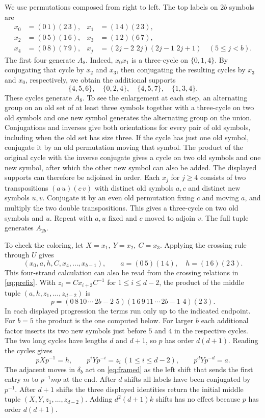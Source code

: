 We use permutations composed from right to left. The top labels on
\(2b\) symbols are
\[
\begin{aligned}
 x_0&=(0\,1)(2\,3), &x_1&=(1\,4)(2\,3),\\
 x_2&=(0\,5)(1\,6), &x_3&=(1\,2)(6\,7),\\
 x_4&=(0\,8)(7\,9), &
 x_j&=(2j-2\,\,2j)(2j-1\,\,2j+1)\quad(5\le j<b).
\end{aligned}
\]
The first four generate \(A_8\). Indeed, \(x_0x_1\) is a
three-cycle on \(\{0,1,4\}\). By conjugating that cycle by \(x_2\)
and \(x_3\), then conjugating the resulting cycles by \(x_3\) and
\(x_0\), respectively, we obtain the additional supports
\[
       \{4,5,6\},\quad \{0,2,4\},\quad \{4,5,7\},\quad \{1,3,4\}.
\]
These cycles generate \(A_8\). To see the enlargement at each step,
an alternating group on an old set of at least three symbols together
with a three-cycle on two old symbols and one new symbol generates
the alternating group on the union. Conjugations and inverses give
both orientations for every pair of old symbols, including when the
old set has size three. If the cycle has just one old symbol,
conjugate it by an old permutation moving that symbol. The product
of the original cycle with the inverse conjugate gives a cycle on
two old symbols and one new symbol, after which the other new
symbol can also be added. The displayed supports can therefore be
adjoined in order. Each \(x_j\) for \(j\ge4\) consists of two
transpositions \((a\,u)(c\,v)\) with distinct old symbols \(a,c\)
and distinct new symbols \(u,v\). Conjugate it by an even old
permutation fixing \(c\) and moving \(a\), and multiply the
two double transpositions. This gives a three-cycle on two old
symbols and \(u\). Repeat with \(a,u\) fixed and \(c\) moved to
adjoin \(v\). The full tuple generates \(A_{2b}\).

To check the coloring, let \(X=x_1,\ Y=x_2,\ C=x_3\).
Applying the crossing rule through \(U\) gives
\[
       (x_0,a,h,C,x_4,\ldots,x_{b-1}),\qquad
       a=(0\,5)(1\,4),\quad h=(1\,6)(2\,3).
\]
This four-strand calculation can also be read from the crossing
relations in \eqref{eq:prefix}. With \(z_i=Cx_{i+3}C^{-1}\) for
\(1\le i\le d-2\), the product of the middle tuple
\((a,h,z_1,\ldots,z_{d-2})\) is
\[
 p=(0\,8\,10\,\cdots\,2b-2\,\,5)
   (1\,6\,9\,11\,\cdots\,2b-1\,\,4)(2\,3).
\]
In each displayed progression the terms run only up to the indicated
endpoint. For \(b=5\) the product is the one computed below.
For larger \(b\) each additional factor inserts its two new
symbols just before \(5\) and \(4\) in the respective cycles.
The two long cycles have lengths \(d\) and \(d+1\), so
\(p\) has order \(d(d+1)\). Reading the cycles gives
\[
        pXp^{-1}=h,\qquad
        p^iYp^{-i}=z_i\ (1\le i\le d-2),\qquad p^dYp^{-d}=a.
\]
The adjacent moves in \(\delta_b\) act on \eqref{eq:framed} as the
left shift that sends the first entry \(m\) to \(p^{-1}mp\) at the
end. After \(d\) shifts all labels have been conjugated by \(p^{-1}\).
After \(d+1\) shifts the three displayed identities return the initial
middle tuple \((X,Y,z_1,\ldots,z_{d-2})\). Adding
\(d^2(d+1)k\) shifts has no effect because \(p\) has order \(d(d+1)\).

